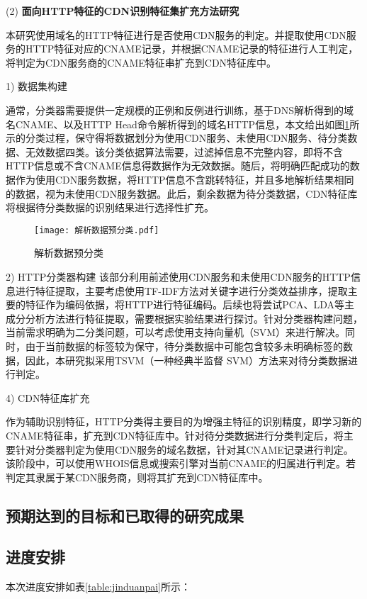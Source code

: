 (2) \textbf{面向HTTP特征的CDN识别特征集扩充方法研究}

本研究使用域名的HTTP特征进行是否使用CDN服务的判定。并提取使用CDN服务的HTTP特征对应的CNAME记录，并根据CNAME记录的特征进行人工判定，将判定为CDN服务商的CNAME特征串扩充到CDN特征库中。

1) 数据集构建

通常，分类器需要提供一定规模的正例和反例进行训练，基于DNS解析得到的域名CNAME、以及HTTP Head命令解析得到的域名HTTP信息，本文给出如图\ref{fig:解析数据预分类}所示的分类过程，保守得将数据划分为使用CDN服务、未使用CDN服务、待分类数据、无效数据四类。该分类依据算法需要，过滤掉信息不完整内容，即将不含HTTP信息或不含CNAME信息得数据作为无效数据。随后，将明确匹配成功的数据作为使用CDN服务数据，将HTTP信息不含跳转特征，并且多地解析结果相同的数据，视为未使用CDN服务数据。此后，剩余数据为待分类数据，CDN特征库将根据待分类数据的识别结果进行选择性扩充。
 
\begin{figure}[h]
	\centering
	\texttt{[image: 解析数据预分类.pdf]}
	\caption{解析数据预分类}
	\label{fig:解析数据预分类}
\end{figure}
\FloatBarrier

2) HTTP分类器构建
该部分利用前述使用CDN服务和未使用CDN服务的HTTP信息进行特征提取，主要考虑使用TF-IDF方法对关键字进行分类效益排序，提取主要的特征作为编码依据，将HTTP进行特征编码。后续也将尝试PCA、LDA等主成分分析方法进行特征提取，需要根据实验结果进行探讨。针对分类器构建问题，当前需求明确为二分类问题，可以考虑使用支持向量机（SVM）来进行解决。同时，由于当前数据的标签较为保守，待分类数据中可能包含较多未明确标签的数据，因此，本研究拟采用TSVM\cite{Joachims1999}（一种经典半监督 SVM）方法来对待分类数据进行判定。


4) CDN特征库扩充

作为辅助识别特征，HTTP分类得主要目的为增强主特征的识别精度，即学习新的CNAME特征串，扩充到CDN特征库中。针对待分类数据进行分类判定后，将主要针对分类器判定为使用CDN服务的域名数据，针对其CNAME记录进行判定。该阶段中，可以使用WHOIS信息或搜索引擎对当前CNAME的归属进行判定。若判定其隶属于某CDN服务商，则将其扩充到CDN特征库中。



\subsection{预期达到的目标和已取得的研究成果}
\subsection{进度安排}
本次进度安排如表\ref{table:jinduanpai}所示：


